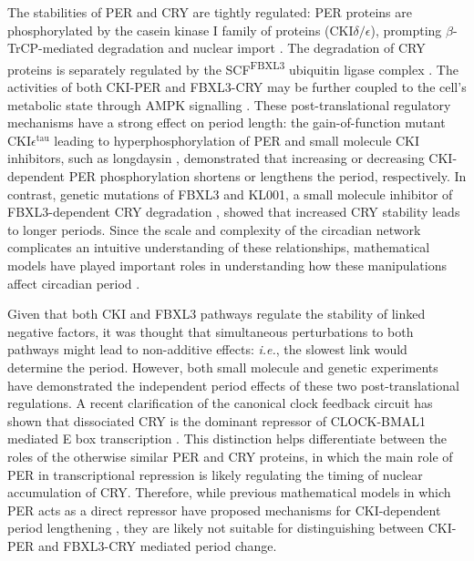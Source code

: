 The stabilities of PER and CRY are tightly regulated: PER proteins are
phosphorylated by the casein kinase I family of proteins (CKI$\delta/\epsilon$),
prompting $\beta$-TrCP-mediated degradation \cite{Reischl2007} and nuclear
import \cite{Takano2004}. The degradation of CRY proteins is separately
regulated by the SCF\textsuperscript{FBXL3} ubiquitin ligase complex
\cite{Busino2007, Godinho2007, Siepka2007}. The activities of both CKI-PER and
FBXL3-CRY may be further coupled to the cell's metabolic state through AMPK
signalling \cite{Lee2013}. These post-translational regulatory mechanisms have a
strong effect on period length: the gain-of-function mutant
CKI$\epsilon^\mathrm{tau}$ leading to hyperphosphorylation of PER
\cite{Gallego2006} and small molecule CKI inhibitors, such as longdaysin
\cite{Hirota2010}, demonstrated that increasing or decreasing CKI-dependent PER
phosphorylation shortens or lengthens the period, respectively. In contrast,
genetic mutations of FBXL3 \cite{Godinho2007, Siepka2007} and KL001, a small
molecule inhibitor of FBXL3-dependent CRY degradation \cite{Hirota2012}, showed
that increased CRY stability leads to longer periods. Since the scale and
complexity of the circadian network complicates an intuitive understanding of
these relationships, mathematical models have played important roles in
understanding how these manipulations affect circadian period \cite{Gallego2006,
Hirota2012, Reischl2007}.

Given that both CKI and FBXL3 pathways regulate the stability of linked
negative factors, it was thought that simultaneous perturbations to both
pathways might lead to non-additive effects: {\it i.e.}, the slowest link would
determine the period.  However, both small molecule \cite{Hirota2012} and
genetic experiments \cite{Maywood2011} have demonstrated the independent period
effects of these two post-translational regulations. A recent clarification of
the canonical clock feedback circuit has shown that dissociated CRY is the
dominant repressor of CLOCK-BMAL1 mediated E box transcription \cite{Ye2011}.
This distinction helps differentiate between the roles of the otherwise similar
PER and CRY proteins, in which the main role of PER in transcriptional
repression is likely regulating the timing of nuclear accumulation of CRY.
Therefore, while previous mathematical models in which PER acts as a direct
repressor have proposed mechanisms for CKI-dependent period lengthening
\cite{Gallego2006, Vanselow2006}, they are likely not suitable for
distinguishing between CKI-PER and FBXL3-CRY mediated period change.

